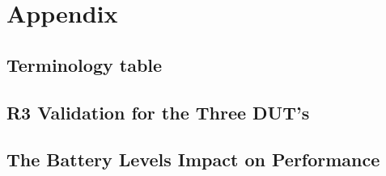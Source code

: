 \chapter{Appendix}\label{ch:appAlabel}

\section{Terminology table}


\newpage


\newpage


\newpage

\section{R3 Validation for the Three DUT's}\label{app:r3_validation}




\newpage



\newpage


\newpage


\section{The Battery Levels Impact on Performance}\label{app:charge}



\newpage

